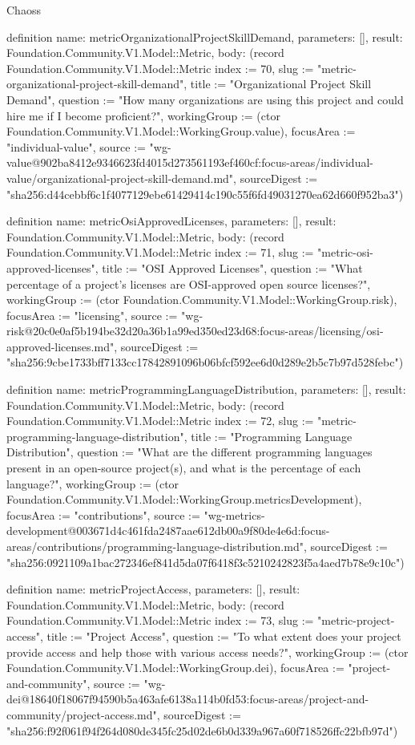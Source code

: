 \begin{lexlean}{Chaoss}
\begin{semanticmodule}
definition{
  name: metricOrganizationalProjectSkillDemand,
  parameters: [],
  result: Foundation.Community.V1.Model::Metric,
  body: (record Foundation.Community.V1.Model::Metric {index := 70, slug := "metric-organizational-project-skill-demand", title := "Organizational Project Skill Demand", question := "How many organizations are using this project and could hire me if I become proficient?", workingGroup := (ctor Foundation.Community.V1.Model::WorkingGroup.value), focusArea := "individual-value", source := "wg-value@902ba8412e9346623fd4015d273561193ef460cf:focus-areas/individual-value/organizational-project-skill-demand.md", sourceDigest := "sha256:d44cebbf6c1f4077129ebe61429414c190c55f6fd49031270ea62d660f952ba3"})
}

definition{
  name: metricOsiApprovedLicenses,
  parameters: [],
  result: Foundation.Community.V1.Model::Metric,
  body: (record Foundation.Community.V1.Model::Metric {index := 71, slug := "metric-osi-approved-licenses", title := "OSI Approved Licenses", question := "What percentage of a project’s licenses are OSI-approved open source licenses?", workingGroup := (ctor Foundation.Community.V1.Model::WorkingGroup.risk), focusArea := "licensing", source := "wg-risk@20c0e0af5b194be32d20a36b1a99ed350ed23d68:focus-areas/licensing/osi-approved-licenses.md", sourceDigest := "sha256:9cbe1733bff7133cc17842891096b06bfcf592ee6d0d289e2b5c7b97d528febc"})
}

definition{
  name: metricProgrammingLanguageDistribution,
  parameters: [],
  result: Foundation.Community.V1.Model::Metric,
  body: (record Foundation.Community.V1.Model::Metric {index := 72, slug := "metric-programming-language-distribution", title := "Programming Language Distribution", question := "What are the different programming languages present in an open-source project(s), and what is the percentage of each language?", workingGroup := (ctor Foundation.Community.V1.Model::WorkingGroup.metricsDevelopment), focusArea := "contributions", source := "wg-metrics-development@003671d4c461fda2487aae612db00a9f80de4e6d:focus-areas/contributions/programming-language-distribution.md", sourceDigest := "sha256:0921109a1bac272346ef841d5da07f6418f3c5210242823f5a4aed7b78e9c10c"})
}

definition{
  name: metricProjectAccess,
  parameters: [],
  result: Foundation.Community.V1.Model::Metric,
  body: (record Foundation.Community.V1.Model::Metric {index := 73, slug := "metric-project-access", title := "Project Access", question := "To what extent does your project provide access and help those with various access needs?", workingGroup := (ctor Foundation.Community.V1.Model::WorkingGroup.dei), focusArea := "project-and-community", source := "wg-dei@18640f18067f94590b5a463afe6138a114b0fd53:focus-areas/project-and-community/project-access.md", sourceDigest := "sha256:f92f061f94f264d080de345fc25d02de6b0d339a967a60f718526ffc22bfb97d"})
}


\end{semanticmodule}
\end{lexlean}

